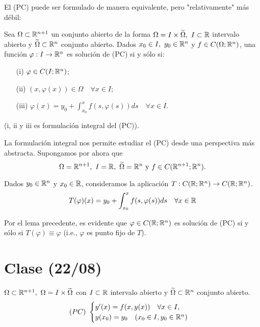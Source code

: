\documentclass[a4paper]{report}
\begin{document}
		\noindent El (PC) puede ser formulado de manera equivalente, pero "relativamente" más débil:

		\begin{lemma}
			Sea $\Omega \subset \mathbb{R}^{n+1}$ un conjunto abierto de la forma $\Omega = I \times \widetilde{\Omega},\ I \subset \mathbb{R}$ intervalo abierto y $\widetilde{\Omega} \subset \mathbb{R}^n$ conjunto abierto. Dados $x_0 \in I,\ y_0 \in \mathbb{R}^n$ y $f \in C(\Omega;\mathbb{R}^n)$, una función $\varphi : I \to \mathbb{R}^n$ es solución de (PC) si y sólo si:
			\begin{enumerate}
				\item[(i)] $\varphi \in C(I;\mathbb{R}^n)$;

				\item[(ii)] $(x,\varphi(x)) \in \Omega \quad \forall x \in I$;

				\item[(iii)] $\varphi (x) = y_0 + \int_{x_0}^{x} f(s,\varphi(s)) ds \quad \forall x \in I$.
			\end{enumerate}
			(i, ii y iii es formulación integral del (PC)).
		\end{lemma}

		\begin{remark}
			La formulación integral nos permite estudiar el (PC) desde una perspectiva más abstracta. Supongamos por ahora que
			\[ \Omega = \mathbb{R}^{n+1},\ I = \mathbb{R},\ \widetilde{\Omega} = \mathbb{R}^n \text{ y } f \in C(\mathbb{R}^{n+1};\mathbb{R}^n). \]
		\end{remark}

		\noindent Dados $y_0 \in \mathbb{R}^n$ y $x_0 \in \mathbb{R}$, consideramos la aplicación $T: C(\mathbb{R};\mathbb{R}^n) \to C(\mathbb{R};\mathbb{R}^n)$.
		\[ T(\varphi)(x) = y_0 + \int_{x_0}^{x} f(s,\varphi(s)) ds \quad \forall x \in \mathbb{R} \]
		
		\noindent Por el lema precedente, es evidente que $\varphi \in C(\mathbb{R};\mathbb{R}^n)$ es solución de (PC) si y sólo si $T(\varphi) \equiv \varphi$ (i.e., $\varphi$ es punto fijo de $T$).


\section{Clase (22/08)}

$\Omega \subset \mathbb{R}^{n+1},\ \Omega = I \times \widetilde{\Omega}$ con $I \subset \mathbb{R}$ intervalo abierto y $\widetilde{\Omega} \subset \mathbb{R}^n$ conjunto abierto.
\[ (PC) \ \begin{cases}
	y'(x) = f(x, y(x))\quad \forall x \in I, \\
	y(x_0) = y_0 \quad (x_0 \in I, y_0 \in \mathbb{R}^n)
\end{cases} \]
\end{document}

